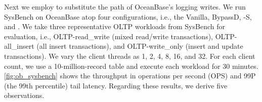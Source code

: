 Next
we employ \odes to substitute the path of OceanBase's logging writes.
We   run SysBench on OceanBase atop four configurations, i.e., the  Vanilla, BypassD, \odes-S, and \odes.
We take three representative OLTP workloads from SysBench for evaluation, i.e., OLTP-read\_write (mixed read/write transactions), OLTP-all\_insert (all insert transactions), and OLTP-write\_only (insert and update transactions). %
 We vary the client threads as 1, 2, 4, 8, 16, and 32. %
 For each client count, we use a 10-million-record table and execute each workload for 30 minutes. %
  \autoref{fig:ob_sysbench}  shows the throughput in operations per second (OPS) and 99P (the 99th percentile) tail latency. Regarding these results, we derive five observations. %

